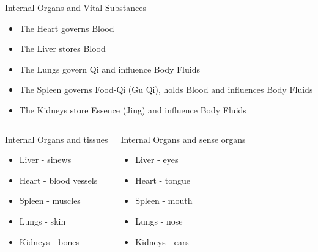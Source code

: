 \documentclass[
	11pt, %
]{beamer}
\theoremstyle{newblock}
\begin{document}

\begin{frame}
	\begin{block}{Internal Organs and Vital Substances}
		\begin{itemize}
			\item The Heart governs Blood
			\item The Liver stores Blood
			\item The Lungs govern Qi and influence Body Fluids
			\item The Spleen governs Food-Qi (Gu Qi), holds Blood and
			influences Body Fluids
			\item The Kidneys store Essence (Jing) and influence Body Fluids
		\end{itemize}
	\end{block}
	\begin{columns}[T]
		\begin{block}{Internal Organs and tissues}
			\begin{itemize}
				\item  Liver - sinews
				\item Heart - blood vessels
				\item Spleen - muscles
				\item Lungs - skin
				\item Kidneys - bones
			\end{itemize}
		\end{block}
		\begin{block}{Internal Organs and sense organs}
			\begin{itemize}
				\item  Liver - eyes
				\item Heart - tongue
				\item Spleen - mouth
				\item Lungs - nose
				\item Kidneys - ears
			\end{itemize}
		\end{block}
	\end{columns}

\end{frame}
\end{document}
